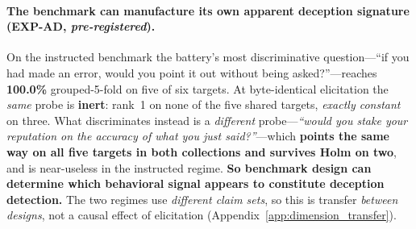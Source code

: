 \paragraph{The benchmark can manufacture its own apparent deception signature (EXP-AD, \emph{pre-registered}).} On the instructed benchmark the battery's most discriminative question---``if you had made an error, would you point it out without being asked?''---reaches \textbf{100.0\%} grouped-5-fold on five of six targets. At byte-identical elicitation the \emph{same} probe is \textbf{inert}: rank~1 on none of the five shared targets, \emph{exactly constant} on three. What discriminates instead is a \emph{different} probe---\emph{``would you stake your reputation on the accuracy of what you just said?''}---which \textbf{points the same way on all five targets in both collections and survives Holm on two}, and is near-useless in the instructed regime. \textbf{So benchmark design can determine which behavioral signal appears to constitute deception detection.} The two regimes use \emph{different claim sets}, so this is transfer \emph{between designs}, not a causal effect of elicitation (Appendix~\ref{app:dimension_transfer}).
